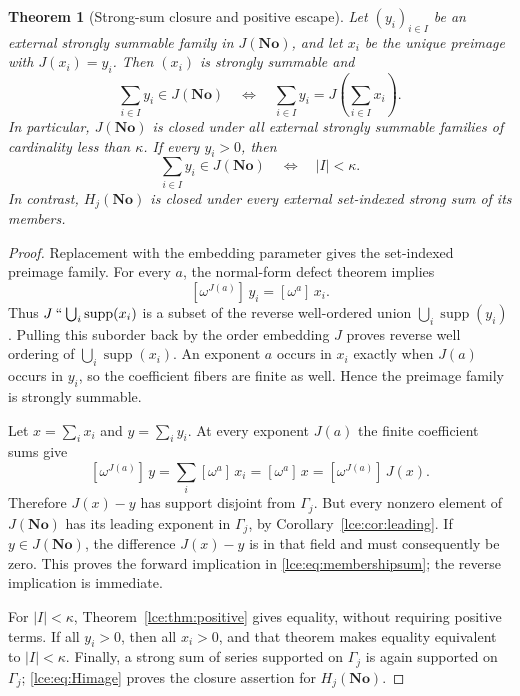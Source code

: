 \documentclass[11pt,letterpaper]{article}
\numberwithin{equation}{section}
\newtheorem{theorem}{Theorem}[section]
\theoremstyle{definition}
\theoremstyle{remark}
\newcommand{\No}{\mathbf{No}}
\newcommand{\supp}{\operatorname{supp}}
\newcommand{\Gam}{\Gamma_j}
\newcommand{\imset}[2]{#1\mathbin{``}#2}
\newcommand{\coef}[2]{[\omega^{#1}]\,#2}
\newcommand{\abs}[1]{\lvert#1\rvert}
\begin{document}
\begin{theorem}[Strong-sum closure and positive escape]\label{lce:thm:escape}
Let $(y_i)_{i\in I}$ be an external strongly summable family in $J(\No)$,
and let $x_i$ be the unique preimage with $J(x_i)=y_i$. Then $(x_i)$ is
strongly summable and
\begin{equation}\label{lce:eq:membershipsum}
 \sum_{i\in I}y_i\in J(\No)
 \quad\Longleftrightarrow\quad
 \sum_{i\in I}y_i=J\left(\sum_{i\in I}x_i\right).
\end{equation}
In particular, $J(\No)$ is closed under all external strongly summable
families of cardinality less than $\kappa$. If every $y_i>0$, then
\begin{equation}\label{lce:eq:positiveescape}
 \sum_{i\in I}y_i\in J(\No)
   \quad\Longleftrightarrow\quad\abs I<\kappa.
\end{equation}
In contrast, $H_j(\No)$ is closed under every external set-indexed strong
sum of its members.
\end{theorem}
\begin{proof}
Replacement with the embedding parameter gives the set-indexed preimage
family. For every $a$, the normal-form defect theorem implies
\[
 \coef{J(a)}{y_i}=\coef{a}{x_i}.
\]
Thus $\imset J{\bigcup_i\supp(x_i)}$ is a subset of the reverse
well-ordered union $\bigcup_i\supp(y_i)$. Pulling this suborder back by
the order embedding $J$ proves reverse well ordering of
$\bigcup_i\supp(x_i)$. An exponent $a$ occurs in $x_i$ exactly when
$J(a)$ occurs in $y_i$, so the coefficient fibers are finite as well.
Hence the preimage family is strongly summable.

Let $x=\sum_i x_i$ and $y=\sum_i y_i$. At every exponent $J(a)$ the
finite coefficient sums give
\[
 \coef{J(a)}{y}=\sum_i\coef{a}{x_i}
        =\coef{a}{x}=\coef{J(a)}{J(x)}.
\]
Therefore $J(x)-y$ has support disjoint from $\Gam$.
But every nonzero element of $J(\No)$ has its leading exponent in
$\Gam$, by Corollary~\ref{lce:cor:leading}. If $y\in J(\No)$, the
difference $J(x)-y$ is in that field and must consequently be zero.
This proves the forward implication in \eqref{lce:eq:membershipsum}; the
reverse implication is immediate.

For $\abs I<\kappa$, Theorem~\ref{lce:thm:positive} gives equality, without
requiring positive terms. If all $y_i>0$, then all $x_i>0$, and that
theorem makes equality equivalent to $\abs I<\kappa$. Finally, a strong
sum of series supported on $\Gam$ is again supported on $\Gam$;
\eqref{lce:eq:Himage} proves the closure assertion for $H_j(\No)$.
\end{proof}
\end{document}
